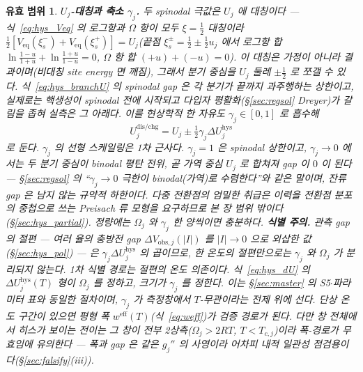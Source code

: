 \documentclass[11pt,a4paper]{article}
\newtheorem*{boundbox}{유효 범위}
\newcommand{\eff}{\mathrm{eff}}
\newcommand{\eq}{\mathrm{eq}}
\newcommand{\dis}{\mathrm{dis}}
\newcommand{\chg}{\mathrm{chg}}
\newcommand{\hys}{\mathrm{hys}}
\begin{document}
\begin{boundbox}
\textbf{$U_j$-대칭과 축소 $\gamma_j$.} 두 spinodal 극값은 $U_j$ 에 \emph{대칭}이다 — 식~\eqref{eq:hys_Veq} 의 로그항과
$\Omega$ 항이 모두 $\xi=\tfrac12$ 대칭이라 $\tfrac12[V_{\eq}(\xi_s^-)+V_{\eq}(\xi_s^+)]=U_j$(끝점 $\xi_s^\pm=\tfrac12\pm
\tfrac12 u_j$ 에서 로그항 합 $\ln\tfrac{1-u}{1+u}+\ln\tfrac{1+u}{1-u}=0$, $\Omega$ 항 합 $(+u)+(-u)=0$). 이 대칭은
\emph{가정이 아니라 결과}이며(비대칭 site energy 면 깨짐), 그래서 분기 중심을 $U_j$ 둘레 $\pm\tfrac12$ 로 쪼갤 수 있다.
식~\eqref{eq:hys_branchU} 의 spinodal gap 은 각 분기가 끝까지 과주행하는 \emph{상한}이고, 실제로는 핵생성이 spinodal
전에 시작되고 다입자 평활화(\S\ref{sec:regsol} Dreyer)가 갈림을 좁혀 실측은 그 아래다. 이를 \emph{현상학적} 한 자유도
$\gamma_j\in[0,1]$ 로 흡수해
\begin{equation}
U_j^{\dis/\chg}=U_j\pm\tfrac12\gamma_j\Delta U_j^\hys
\label{eq:hys_center}
\end{equation}
로 둔다. $\gamma_j$ 의 선형 스케일링은 1차 근사다. $\gamma_j=1$ 은 spinodal 상한이고, $\gamma_j\to0$ 에서는 두 분기 중심이 binodal 평탄 전위, 곧 가역 중심
$U_j$ 로 합쳐져 gap 이 $0$ 이 된다 — \S\ref{sec:regsol} 의 ``$\gamma_j\to0$ 극한이 binodal(가역)로
수렴한다''와 같은 말이며, 잔류 gap 은 남지 않는 규약적 하한이다. 다중 전환점의 엄밀한 취급은 이력을 전환점
분포의 중첩으로 쓰는 Preisach 류 모형을 요구하므로 본 장 범위 밖이다(\S\ref{sec:hys_partial}). 정량에는
$\Omega_j$ 와 $\gamma_j$ 한 양씩이면 충분하다. \textbf{식별 주의.} 관측 gap 의 \emph{절편} — 여러 율의 충방전 gap $\Delta V_{\mathrm{obs},j}(|I|)$ 를
$|I|\to0$ 으로 외삽한 값(\S\ref{sec:hys_pol}) — 은 $\gamma_j\Delta U_j^\hys$ 의 곱이므로, 한 온도의 절편만으로는
$\gamma_j$ 와 $\Omega_j$ 가 분리되지 않는다. 1차 식별 경로는 절편의 온도 의존이다. 식~\eqref{eq:hys_dU} 의
$\Delta U_j^\hys(T)$ 형이 $\Omega_j$ 를 정하고, 크기가 $\gamma_j$ 를 정한다. 이는 \S\ref{sec:master} 의
S5$\cdot$파라미터 표와 동일한 절차이며, $\gamma_j$ 가 측정창에서 $T$-무관이라는 전제 위에 선다. 단상 온도
구간이 있으면 평형 폭 $w^\eff(T)$(식~\eqref{eq:weff})가 검증 경로가 된다. 다만 창 전체에서 히스가 보이는
전이는 그 창이 전부 2상측($\Omega_j>2RT$, $T<T_{c,j}$)이라 폭-경로가 무효임에 유의한다 — 폭과 gap 은 같은
$g_j''$ 의 사영이라 어차피 내적 일관성 점검용이다(\S\ref{sec:falsify}(iii)).
\end{boundbox}

\end{document}
